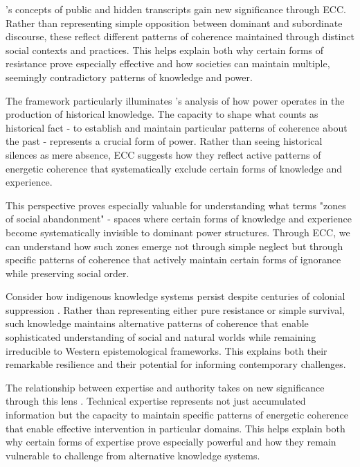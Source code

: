 \begin{refsection}
\cite{scott1990domination}'s concepts of public and hidden transcripts gain new significance through ECC. Rather than representing simple opposition between dominant and subordinate discourse, these reflect different patterns of coherence maintained through distinct social contexts and practices. This helps explain both why certain forms of resistance prove especially effective and how societies can maintain multiple, seemingly contradictory patterns of knowledge and power.

The framework particularly illuminates \cite{trouillot1995silencing}'s analysis of how power operates in the production of historical knowledge. The capacity to shape what counts as historical fact - to establish and maintain particular patterns of coherence about the past - represents a crucial form of power. Rather than seeing historical silences as mere absence, ECC suggests how they reflect active patterns of energetic coherence that systematically exclude certain forms of knowledge and experience.

This perspective proves especially valuable for understanding what \cite{biehl2005vita} terms "zones of social abandonment" - spaces where certain forms of knowledge and experience become systematically invisible to dominant power structures. Through ECC, we can understand how such zones emerge not through simple neglect but through specific patterns of coherence that actively maintain certain forms of ignorance while preserving social order.

Consider how indigenous knowledge systems persist despite centuries of colonial suppression \cite{povinelli2002cunning}. Rather than representing either pure resistance or simple survival, such knowledge maintains alternative patterns of coherence that enable sophisticated understanding of social and natural worlds while remaining irreducible to Western epistemological frameworks. This explains both their remarkable resilience and their potential for informing contemporary challenges.

The relationship between expertise and authority takes on new significance through this lens \cite{latour1987science}. Technical expertise represents not just accumulated information but the capacity to maintain specific patterns of energetic coherence that enable effective intervention in particular domains. This helps explain both why certain forms of expertise prove especially powerful and how they remain vulnerable to challenge from alternative knowledge systems.


\end{refsection}
